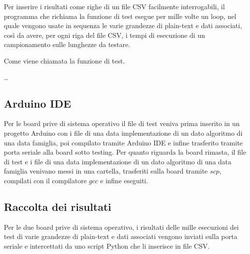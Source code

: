 \documentclass[12pt,a4paper,italian]{report}
\begin{document}
\noindent Per inserire i risultati come righe di un file CSV facilmente interrogabili, il programma che richiama la funzione di test esegue per mille volte un loop, nel quale vengono usate in sequenza le varie grandezze di plain-text e dati associati, così da avere, per ogni riga del file CSV, i tempi di esecuzione di un campionamento sulle lunghezze da testare.

\begin{algorithm}
    \caption{Come viene chiamata la funzione di test.}
    \begin{algorithmic}[1]
            \State {}
            \State \dots
            \State {}
        \EndFor
    \end{algorithmic}
\end{algorithm}

\subsection{Arduino IDE}

Per le board prive di sistema operativo il file di test veniva prima inserito in un progetto Arduino con i file di una data implementazione di un dato algoritmo di una data famiglia, poi compilato tramite Arduino IDE e infine trasferito tramite porta seriale alla board sotto testing. Per quanto riguarda la board rimasta, il file di test e i file di una data implementazione di un dato algoritmo di una data famiglia venivano messi in una cartella, trasferiti sulla board tramite $scp$, compilati con il compilatore $gcc$ e infine eseguiti.

\subsection{Raccolta dei risultati}

Per le due board prive di sistema operativo, i risultati delle mille esecuzioni dei test di varie grandezze di plain-text e dati associati vengono inviati sulla porta seriale e intercettati da uno script Python che li inserisce in file CSV.
\end{document}
